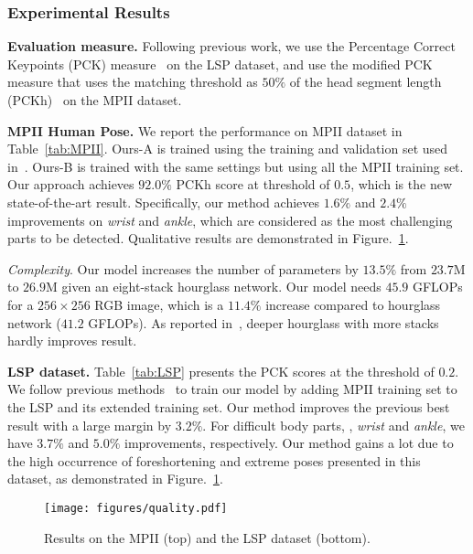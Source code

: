 \documentclass[10pt,twocolumn,letterpaper]{article}
\newcommand{\smalltitle}[1]{\vspace{0.2em}\noindent \textbf{{#1}}}
\begin{document}
\subsubsection{Experimental Results}

\smalltitle{Evaluation measure.} Following previous work, we use the Percentage Correct Keypoints (PCK) measure~\cite{yang2013articulated} on the LSP dataset, and use the modified PCK measure that uses the matching threshold as $50\%$ of the head segment length (PCKh)~\cite{andriluka20142d} on the MPII dataset.

\smalltitle{MPII Human Pose.} 
We report the performance on MPII dataset in Table~\ref{tab:MPII}. 
Ours-A is trained using the training and validation set used in~\cite{tompson2015efficient}. 
Ours-B is trained with the same settings but using all the MPII training set. 
Our approach achieves $92.0\%$ PCKh score at threshold of $0.5$, which is the new state-of-the-art result. 
Specifically, our method achieves $1.6\%$ and $2.4\%$ improvements on \textit{wrist} and \textit{ankle}, which are considered as the most challenging parts to be detected. 
Qualitative results are demonstrated in Figure.~\ref{fig:qualitative_results}.

\textit{Complexity}. 
Our model increases the number of parameters by $13.5\%$ from  $23.7$M  to $26.9$M  given an eight-stack hourglass network. 
Our model needs $45.9$ GFLOPs for a $256\times256$ RGB image, which is a $11.4\%$ increase compared to hourglass network ($41.2$ GFLOPs). 
As reported in~\cite{newell2016stacked}, deeper hourglass with more stacks hardly improves result.

\smalltitle{LSP dataset.}
Table~\ref{tab:LSP} presents the PCK scores at the threshold of $0.2$. We follow previous methods~\cite{pishchulin2016deepcut,wei2016convolutional,insafutdinov2016deepercut} to train our model by adding MPII training set to the LSP and its extended training set. 
Our method improves the previous best result with a large margin by $3.2\%$. 
For difficult body parts, \eg, \textit{wrist} and \textit{ankle}, we have $3.7\%$ and $5.0\%$ improvements, respectively. 
Our method gains a lot due to the high occurrence of foreshortening and extreme poses presented in this dataset, as demonstrated in Figure.~\ref{fig:qualitative_results}. 

\begin{figure}[t]
\begin{center}
\texttt{[image: figures/quality.pdf]}
\end{center}
	\vspace{-1em}
   \caption{ Results on the MPII (top) and the LSP dataset (bottom).}
	\label{fig:qualitative_results}
	\vspace{-1em}
\end{figure}
\end{document}

